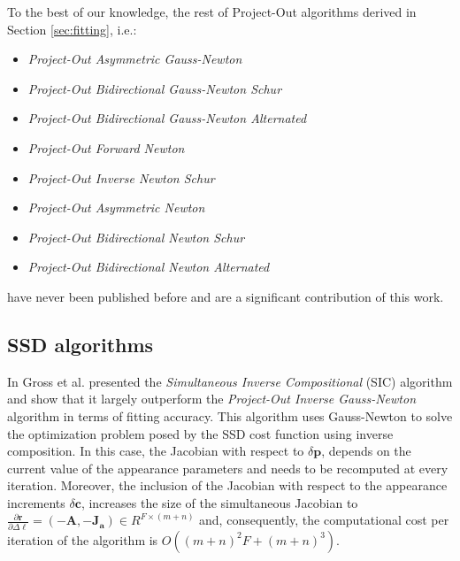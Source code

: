 To the best of our knowledge, the rest of Project-Out algorithms derived in Section \ref{sec:fitting}, i.e.:
\begin{itemize}
\item \emph{Project-Out Asymmetric Gauss-Newton}
\item \emph{Project-Out Bidirectional Gauss-Newton Schur}
\item \emph{Project-Out Bidirectional Gauss-Newton Alternated}
\item \emph{Project-Out Forward Newton}
\item \emph{Project-Out Inverse Newton Schur}
\item \emph{Project-Out Asymmetric Newton}
\item \emph{Project-Out Bidirectional Newton Schur}
\item \emph{Project-Out Bidirectional Newton Alternated}
\end{itemize}
have never been published before and are a significant contribution of this work.

\subsection{SSD algorithms}

In \cite{Gross2005} Gross et al. presented the \emph{Simultaneous Inverse Compositional} (SIC) algorithm and show that it largely outperform the \emph{Project-Out Inverse Gauss-Newton} algorithm in terms of fitting accuracy. This algorithm uses Gauss-Newton to solve the optimization problem posed by the SSD cost function using inverse composition. In this case, the Jacobian with respect to $\delta\mathbf{p}$, depends on the current value of the appearance parameters and needs to be recomputed at every iteration. Moreover, the inclusion of the Jacobian with respect to the appearance increments $\delta\mathbf{c}$, increases the size of the simultaneous Jacobian to $\frac{\partial\mathbf{r}}{\partial\Delta\boldsymbol{\ell}} = \left( -\mathbf{A}, -\mathbf{J}_\mathbf{a} \right) \in R^{F \times (m + n)}$ and, consequently, the computational cost per iteration of the algorithm is $O((m + n)^2F + (m + n)^3)$.

